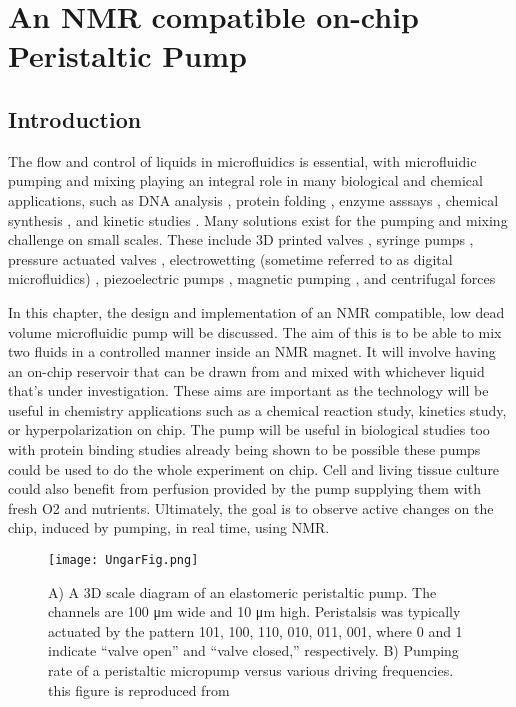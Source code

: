
\chapter{An NMR compatible on-chip Peristaltic Pump}\label{Chapter:Peristaltics}

\section{Introduction}

The flow and control of liquids in microfluidics is essential, with microfluidic pumping
and mixing playing an integral role in many biological and chemical applications, such as
DNA analysis \citep{RN74, RN75}, protein folding \citep{RN76}, enzyme asssays \citep{RN77, RN78},
chemical synthesis \citep{RN79,RN80}, and kinetic studies \citep{RN81, RN82}. Many solutions exist for
the pumping and mixing challenge on small scales. These include 3D printed valves \citep{RN83, RN84},
syringe pumps \citep{RN85,RN86,RN87}, pressure actuated valves \citep{RN88, RN89, RN90}, electrowetting
(sometime referred to as digital microfluidics) \citep{RN91, RN92}, piezoelectric pumps \citep{RN93, RN94},
magnetic pumping \citep{RN95,RN96}, and centrifugal forces \citep{RN97, RN98, RN99}

In this chapter, the design and implementation of an NMR compatible, low dead volume
microfluidic pump will be discussed. The aim of this is to be able to mix two fluids in a
controlled manner inside an NMR magnet. It will involve having an on-chip reservoir that
can be drawn from and mixed with whichever liquid that’s under investigation. These aims
are important as the technology will be useful in chemistry applications such as a chemical
reaction study, kinetics study, or hyperpolarization on chip. The pump will be useful in
biological studies too with protein binding studies already being shown to be possible \citep{RN26}
these pumps could be used to do the whole experiment on chip. Cell and living tissue
culture could also benefit from perfusion provided by the pump supplying them with fresh O2
and nutrients. Ultimately, the goal is to observe active changes on the chip, induced by
pumping, in real time, using NMR.

\begin{figure}
\begin{center}
  \texttt{[image: UngarFig.png]}
\end{center}
  \caption{A) A 3D scale diagram of an elastomeric peristaltic pump. The channels are 100 μm wide and 10 μm high.
  Peristalsis was typically actuated by the pattern 101, 100, 110, 010, 011, 001, where 0 and 1 indicate “valve open”
  and “valve closed,” respectively. B) Pumping rate of a peristaltic micropump versus various driving frequencies. this
  figure is reproduced from\citep{RN59}}
  \label{fig:Ungar}
\end{figure}

